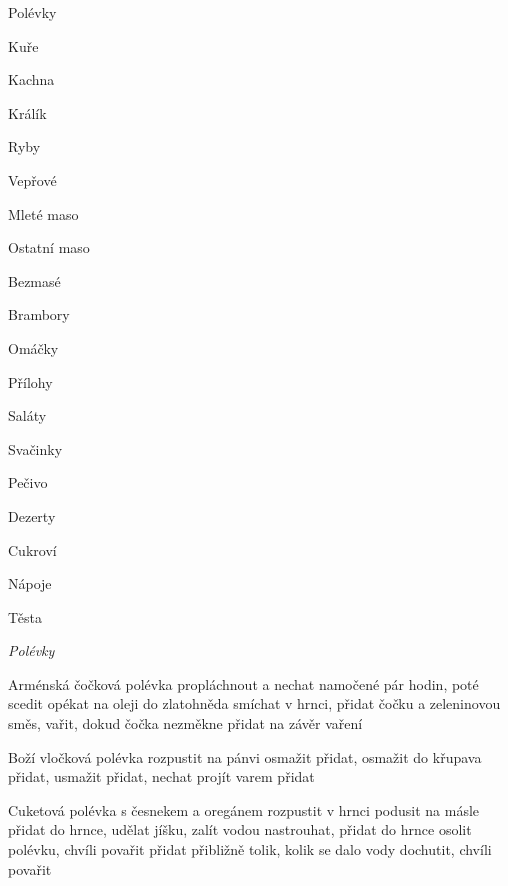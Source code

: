 \documentclass[12pt,a4paper]{article}
\begin{document}
\vspace*{\fill}
{\Huge\it
\centerline{Polévky}
\centerline{Kuře}
\centerline{Kachna}
\centerline{Králík}
\centerline{Ryby}
\centerline{Vepřové}
\centerline{Mleté maso}
\centerline{Ostatní maso}
\centerline{Bezmasé}
\centerline{Brambory}
\centerline{Omáčky}
\centerline{Přílohy}
\centerline{Saláty}
\centerline{Svačinky}
\centerline{Pečivo}
\centerline{Dezerty}
\centerline{Cukroví}
\centerline{Nápoje}
\centerline{Těsta}
}
\vspace*{\fill}
\newpage

\vspace*{\fill}
\hfill {\Huge\it Polévky}\hfill
\vspace*{\fill}
\newpage

\begin{recipe}{Arménská čočková polévka}
   propláchnout a nechat namočené pár hodin, poté scedit
   opékat na oleji do zlatohněda
   smíchat v hrnci, přidat čočku a zeleninovou směs, vařit, dokud čočka nezměkne
   přidat na závěr vaření
\end{recipe}
\newpage

\begin{recipe}{Boží vločková polévka}
    rozpustit na pánvi
    osmažit
    přidat, osmažit do křupava
    přidat, usmažit
    přidat, nechat projít varem
    přidat
\end{recipe}
\newpage

\begin{recipe}{Cuketová polévka s česnekem a oregánem}
    rozpustit v hrnci
    podusit na másle
    přidat do hrnce, udělat jíšku, zalít vodou
    nastrouhat, přidat do hrnce
    osolit polévku, chvíli povařit
    přidat přibližně tolik, kolik se dalo vody
    dochutit, chvíli povařit
\end{recipe}
\newpage
\end{document}
